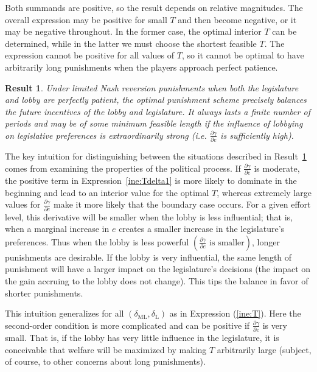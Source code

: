 \documentclass[authoryear, review]{elsarticle}
\newtheorem{result}{Result}
\newcommand{\ga}{\gamma}
\newcommand{\de}{\delta}
\begin{document}
Both summands are positive, so the result depends on relative magnitudes. The overall expression may be positive for small $T$ and then become negative, or it may be negative throughout. In the former case, the optimal interior $T$ can be determined, while in the latter we must choose the shortest feasible $T$. The expression cannot be positive for all values of $T$, so it cannot be optimal to have arbitrarily long punishments when the players approach perfect patience.

\begin{result}
  Under limited Nash reversion punishments when both the legislature and lobby are perfectly patient, the optimal punishment scheme precisely balances the future incentives of the lobby and legislature. It always lasts a finite number of periods and may be of some minimum feasible length if the influence of lobbying on legislative preferences is extraordinarily strong (i.e. $\frac{\partial \ga}{\partial e}$ is sufficiently high).
  \label{res:opt1}
\end{result}
The key intuition for distinguishing between the situations described in Result~\ref{res:opt1} comes from examining the properties of the political process. If $\frac{\partial \ga}{\partial e}$ is moderate, the positive term in Expression~\ref{ine:Tdelta1} is more likely to dominate in the beginning and lead to an interior value for the optimal $T$, whereas extremely large values for $\frac{\partial \ga}{\partial e}$ make it more likely that the boundary case occurs. For a given effort level, this derivative will be smaller when the lobby is less influential; that is, when a marginal increase in $e$ creates a smaller increase in the legislature's preferences. Thus when the lobby is less powerful $\left(\frac{\partial \ga}{\partial e}\text{ is smaller}\right)$, longer punishments are desirable. If the lobby is very influential, the same length of punishment will have a larger impact on the legislature's decisions (the impact on the gain accruing to the lobby does not change). This tips the balance in favor of shorter punishments.

This intuition generalizes for all $\left(\de_\text{ML},\de_\text{L}\right)$ as in Expression (\ref{ine:T}). Here the second-order condition is more complicated and can be positive if $\frac{\partial \ga}{\partial e}$ is very small. That is, if the lobby has very little influence in the legislature, it is conceivable that welfare will be maximized by making $T$ arbitrarily large (subject, of course, to other concerns about long punishments).
\end{document}
